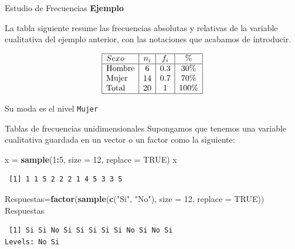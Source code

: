 \documentclass[
  ignorenonframetext,
]{beamer}
\newenvironment{Shaded}{\begin{snugshade}}{\end{snugshade}}
\newcommand{\AttributeTok}[1]{\textcolor[rgb]{0.13,0.29,0.53}{#1}}
\newcommand{\ConstantTok}[1]{\textcolor[rgb]{0.56,0.35,0.01}{#1}}
\newcommand{\DecValTok}[1]{\textcolor[rgb]{0.00,0.00,0.81}{#1}}
\newcommand{\FunctionTok}[1]{\textcolor[rgb]{0.13,0.29,0.53}{\textbf{#1}}}
\newcommand{\NormalTok}[1]{#1}
\newcommand{\OtherTok}[1]{\textcolor[rgb]{0.56,0.35,0.01}{#1}}
\newcommand{\SpecialCharTok}[1]{\textcolor[rgb]{0.81,0.36,0.00}{\textbf{#1}}}
\newcommand{\StringTok}[1]{\textcolor[rgb]{0.31,0.60,0.02}{#1}}
\begin{document}
\begin{frame}[fragile]{Estudio de Frecuencias}
\label{estudio-de-frecuencias-4}
\textbf{Ejemplo}

La tabla siguiente resume las frecuencias absolutas y relativas de la
variable cualitativa del ejemplo anterior, con las notaciones que
acabamos de introducir.

\[\begin{array}{|l|c|c|c|}
\hline
Sexo   & n_i & f_i & \%     \\ 
\hline
\text{Hombre} & 6    & 0.3  & 30\%   \\ 
\text{Mujer}  & 14   & 0.7  & 70\%   \\ 
\text{Total}  & 20   & 1    & 100\%  \\
\hline
\end{array}\]

Su moda es el nivel \texttt{Mujer}
\end{frame}

\begin{frame}[fragile]{Tablas de frecuencias unidimensionales}
\label{tablas-de-frecuencias-unidimensionales}
Supongamos que tenemos una variable cualitativa guardada en un vector o
un factor como la siguiente:

\begin{Shaded}
\begin{Highlighting}[]
\NormalTok{x }\OtherTok{=} \FunctionTok{sample}\NormalTok{(}\DecValTok{1}\SpecialCharTok{:}\DecValTok{5}\NormalTok{, }\AttributeTok{size =} \DecValTok{12}\NormalTok{, }\AttributeTok{replace =} \ConstantTok{TRUE}\NormalTok{)}
\NormalTok{x}
\end{Highlighting}
\end{Shaded}

\begin{verbatim}
 [1] 1 1 5 2 2 2 1 4 5 3 3 5
\end{verbatim}

\begin{Shaded}
\begin{Highlighting}[]
\NormalTok{Respuestas}\OtherTok{=}\FunctionTok{factor}\NormalTok{(}\FunctionTok{sample}\NormalTok{(}\FunctionTok{c}\NormalTok{(}\StringTok{"Si"}\NormalTok{, }\StringTok{"No"}\NormalTok{), }\AttributeTok{size =} \DecValTok{12}\NormalTok{, }\AttributeTok{replace =} \ConstantTok{TRUE}\NormalTok{)) }
\NormalTok{Respuestas}
\end{Highlighting}
\end{Shaded}

\begin{verbatim}
 [1] Si Si No Si Si Si Si Si No Si No Si
Levels: No Si
\end{verbatim}
\end{frame}
\end{document}
